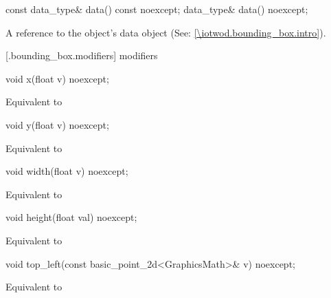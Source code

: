 %
\begin{itemdecl}
const data_type& data() const noexcept;
data_type& data() noexcept;
\end{itemdecl}
\begin{itemdescr}
\pnum
\returns
A reference to the  object's data object (See: \ref{\iotwod.bounding_box.intro}).
\end{itemdescr}

 [\iotwod.bounding_box.modifiers]{ modifiers}

%
\begin{itemdecl}
void x(float v) noexcept;
\end{itemdecl}
\begin{itemdescr}
\pnum
\effects
Equivalent to 
\end{itemdescr}

%
\begin{itemdecl}
void y(float v) noexcept;
\end{itemdecl}
\begin{itemdescr}
\pnum
\effects
Equivalent to 
\end{itemdescr}

%
\begin{itemdecl}
void width(float v) noexcept;
\end{itemdecl}
\begin{itemdescr}
\pnum
\effects
Equivalent to 
\end{itemdescr}

%
\begin{itemdecl}
void height(float val) noexcept;
\end{itemdecl}
\begin{itemdescr}
\pnum
\effects
Equivalent to 
\end{itemdescr}

%
\begin{itemdecl}
void top_left(const basic_point_2d<GraphicsMath>& v) noexcept;
\end{itemdecl}
\begin{itemdescr}
\pnum
\effects
Equivalent to 
\end{itemdescr}

